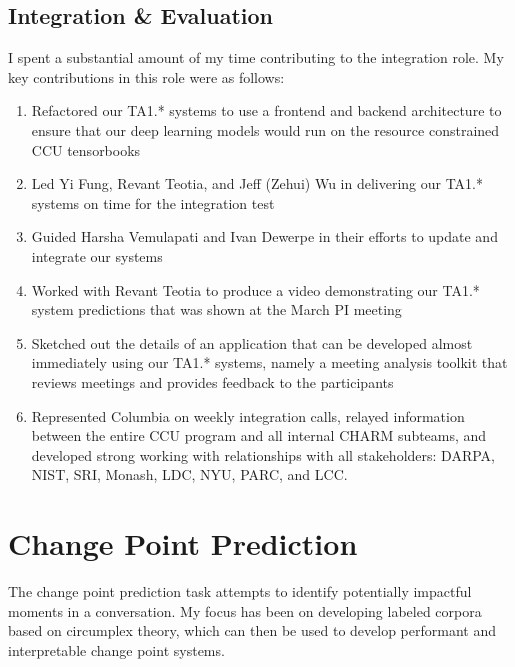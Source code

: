 \documentclass[12pt]{article}
\begin{document}
\subsection{Integration \& Evaluation}
\label{sec:integration}
I spent a substantial amount of my time contributing to the integration role. My key contributions in this role were as follows:
\begin{enumerate}
    \item Refactored our TA1.* systems to use a frontend and backend architecture to ensure that our deep learning models would run on the resource constrained CCU tensorbooks
    \item Led Yi Fung, Revant Teotia, and Jeff (Zehui) Wu in delivering our TA1.* systems on time for the integration test
    \item Guided Harsha Vemulapati and Ivan Dewerpe in their efforts to update and integrate our systems
    \item Worked with Revant Teotia to produce a video demonstrating our TA1.* system predictions that was shown at the March PI meeting
    \item Sketched out the details of an application that can be developed almost immediately using our TA1.* systems, namely a meeting analysis toolkit that reviews meetings and provides feedback to the participants
    \item Represented Columbia on weekly integration calls, relayed information between the entire CCU program and all internal CHARM subteams, and developed strong working with relationships with all stakeholders: DARPA, NIST, SRI, Monash, LDC, NYU, PARC, and LCC.
    
\end{enumerate}

\section{Change Point Prediction}
The change point prediction task attempts to identify potentially impactful moments in a conversation. My focus has been on developing labeled corpora based on circumplex theory, which can then be used to develop performant and interpretable change point systems.
\end{document}
